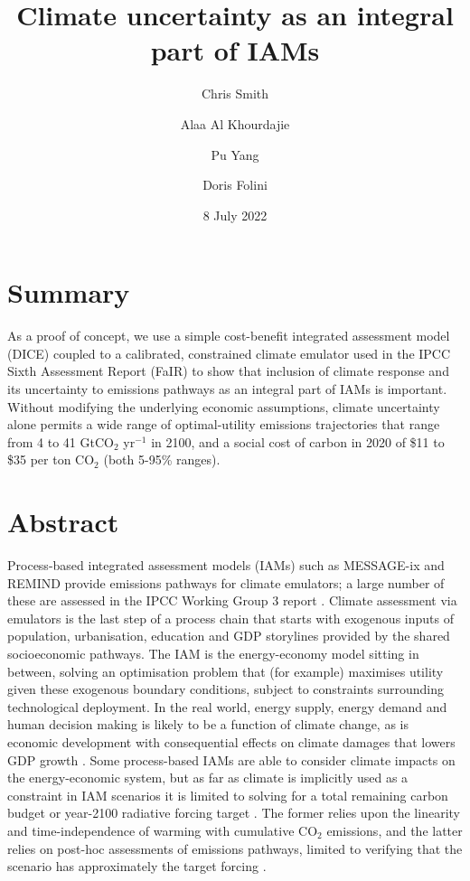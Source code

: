 \documentclass{article}
\title{Climate uncertainty as an integral part of IAMs}
\author[1,3]{Chris Smith}
\author[2,3]{Alaa Al Khourdajie}
\author[4]{Pu Yang}
\author[5]{Doris Folini}
\affil[1]{University of Leeds, UK}
\affil[2]{Imperial College London, UK}
\affil[3]{International Institute for Applied Systems Analysis, Austria}
\affil[4]{University College London, UK}
\affil[5]{ETH Zürich, Switzerland}
\date{8 July 2022}
\begin{document}
\maketitle

\section*{Summary}

As a proof of concept, we use a simple cost-benefit integrated assessment model (DICE) coupled to a calibrated, constrained climate emulator used in the IPCC Sixth Assessment Report (FaIR) to show that inclusion of climate response and its uncertainty to emissions pathways as an integral part of IAMs is important. Without modifying the underlying economic assumptions, climate uncertainty alone permits a wide range of optimal-utility emissions trajectories that range from 4 to 41 GtCO$_2$ yr$^{-1}$ in 2100, and a social cost of carbon in 2020 of \$11 to \$35 per ton CO$_2$ (both 5-95\% ranges). 

\section*{Abstract}

Process-based integrated assessment models (IAMs) such as MESSAGE-ix and REMIND provide emissions pathways for climate emulators; a large number of these are assessed in the IPCC Working Group 3 report \citep{Kikstra2022,Riahi2022}. Climate assessment via emulators is the last step of a process chain that starts with exogenous inputs of population, urbanisation, education and GDP storylines provided by the shared socioeconomic pathways. The IAM is the energy-economy model sitting in between, solving an optimisation problem that (for example) maximises utility given these exogenous boundary conditions, subject to constraints surrounding technological deployment. In the real world, energy supply, energy demand and human decision making is likely to be a function of climate change, as is economic development with consequential effects on climate damages that lowers GDP growth \citep{Rising2022}. Some process-based IAMs are able to consider climate impacts on the energy-economic system, but as far as climate is implicitly used as a constraint in IAM scenarios it is limited to solving for a total remaining carbon budget \citep{Riahi2022} or year-2100 radiative forcing target \citep{ONeill2016}. The former relies upon the linearity and time-independence of warming with cumulative CO$_2$ emissions, and the latter relies on post-hoc assessments of emissions pathways, limited to verifying that the scenario has approximately the target forcing \citep{Gidden2019}. 
\end{document}
